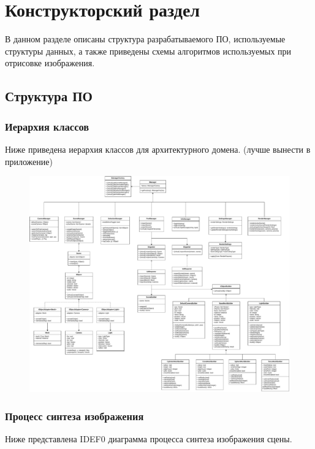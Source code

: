 \chapter{Конструкторский раздел}

В данном разделе описаны структура разрабатываемого ПО, используемые структуры данных, а также приведены схемы алгоритмов используемых при отрисовке изображения.

\section{Структура ПО}

\subsection{Иерархия классов}

Ниже приведена иерархия классов для архитектурного домена. (лучше вынести в приложение)

\begin{figure}
	\centering
	\includegraphics[angle=90,origin=c,width=\linewidth,height=0.85\textheight,keepaspectratio]{diagrams/uml.pdf}
\end{figure}

\subsection{Процесс синтеза изображения}

Ниже представлена IDEF0 диаграмма процесса синтеза изображения сцены.

